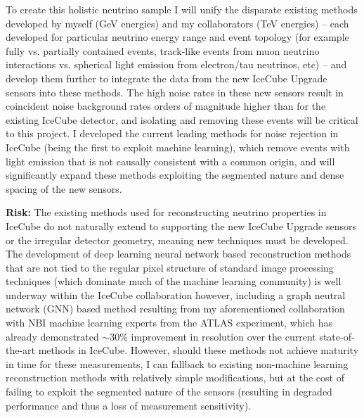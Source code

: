 \documentclass[a4paper,11pt]{article}
\begin{document}
To create this holistic neutrino sample I will unify the disparate existing methods developed by myself (GeV energies) and my collaborators (TeV energies) -- each developed for particular neutrino energy range and event topology (for example fully vs. partially contained events, track-like events from muon neutrino interactions vs. spherical light emission from electron/tau neutrinos, etc) -- and develop them further to integrate the data from the new IceCube Upgrade sensors into these methods. The high noise rates in these new sensors result in coincident noise background rates orders of magnitude higher than for the existing IceCube detector, and isolating and removing these events will be critical to this project. I developed the current leading methods for noise rejection in IceCube (being the first to exploit machine learning), which remove events with light emission that is not causally consistent with a common origin, and will significantly expand these methods exploiting the segmented nature and dense spacing of the new sensors.

\textbf{Risk:} The existing methods used for reconstructing neutrino properties in IceCube do not naturally extend to supporting the new IceCube Upgrade sensors or the irregular detector geometry, meaning new techniques must be developed. The development of deep learning neural network based reconstruction methods that are not tied to the regular pixel structure of standard image processing techniques (which dominate much of the machine learning community) is well underway within the IceCube collaboration however, including a graph neutral network (GNN) based method resulting from my aforementioned collaboration with NBI machine learning experts from the ATLAS experiment, which has already demonstrated $\sim$30\% improvement in resolution over the current state-of-the-art methods in IceCube. However, should these methods not achieve maturity in time for these measurements, I can fallback to existing non-machine learning reconstruction methods with relatively simple modifications, but at the cost of failing to exploit the segmented nature of the sensors (resulting in degraded performance and thus a loss of measurement sensitivity). \\

\end{document}
